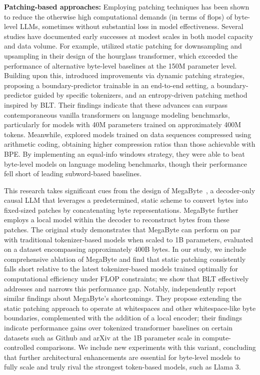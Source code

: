 \textbf{Patching-based approaches:} Employing patching techniques has been shown to reduce the otherwise high computational demands (in terms of flops) of byte-level LLMs, sometimes without substantial loss in model effectiveness. Several studies have documented early successes at modest scales in both model capacity and data volume. For example, \cite{nawrot-etal-2022-hierarchical} utilized static patching for downsampling and upsampling in their design of the hourglass transformer, which exceeded the performance of alternative byte-level baselines at the 150M parameter level. Building upon this, \cite{nawrot-etal-2023-efficient} introduced improvements via dynamic patching strategies, proposing a boundary-predictor trainable in an end-to-end setting, a boundary-predictor guided by specific tokenizers, and an entropy-driven patching method inspired by {\textsc BLT}. Their findings indicate that these advances can surpass contemporaneous vanilla transformers on language modeling benchmarks, particularly for models with 40M parameters trained on approximately 400M tokens. Meanwhile, \cite{lester2024training} explored models trained on data sequences compressed using arithmetic coding, obtaining higher compression ratios than those achievable with BPE. By implementing an equal-info windows strategy, they were able to beat byte-level models on language modeling benchmarks, though their performance fell short of leading subword-based baselines.

This research takes significant cues from the design of MegaByte~\citep{yu2023megabyte}, a decoder-only causal LLM that leverages a predetermined, static scheme to convert bytes into fixed-sized patches by concatenating byte representations. MegaByte further employs a local model within the decoder to reconstruct bytes from these patches. The original study demonstrates that MegaByte can perform on par with traditional tokenizer-based models when scaled to 1B parameters, evaluated on a dataset encompassing approximately 400B bytes. In our study, we include comprehensive ablation of MegaByte and find that static patching consistently falls short relative to the latest tokenizer-based models trained optimally for computational efficiency under FLOP constraints; we show that {\textsc BLT} effectively addresses and narrows this performance gap. Notably, \cite{slagle2024spacebyte} independently report similar findings about MegaByte’s shortcomings. They propose extending the static patching approach to operate at whitespaces and other whitespace-like byte boundaries, complemented with the addition of a local encoder; their findings indicate performance gains over tokenized transformer baselines on certain datasets such as Github and arXiv at the 1B parameter scale in compute-controlled comparisons. We include new experiments with this variant, concluding that further architectural enhancements are essential for byte-level models to fully scale and truly rival the strongest token-based models, such as Llama 3.


